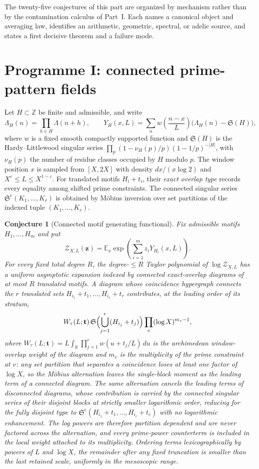 \documentclass[11pt]{article}
\newtheorem{conjecture}{Conjecture}
\theoremstyle{definition}
\newcommand{\SG}{\mathfrak S}
\newcommand{\E}{\mathbb E}
\newcommand{\Z}{\mathbb Z}
\newcommand{\R}{\mathbb R}
\newcommand{\eps}{\varepsilon}
\providecommand{\Z}{\mathbb Z}
\providecommand{\R}{\mathbb R}
\providecommand{\E}{\mathbb E}
\begin{document}
The twenty-five conjectures of this part are organized by mechanism rather
than by the contamination calculus of Part~I.  Each names a canonical
object and averaging law, identifies an arithmetic, geometric, spectral, or
adelic source, and states a first decisive theorem and a failure mode.

\section{Programme I: connected prime-pattern fields}

Let $H\subset\Z$ be finite and admissible, and write
\[
 \Lambda_H(n)=\prod_{h\in H}\Lambda(n+h),\qquad
 Y_H(x,L)=\sum_n w\!\left(\frac{n-x}{L}\right)
 \bigl(\Lambda_H(n)-\SG(H)\bigr),
\]
where $w$ is a fixed smooth compactly supported function and $\SG(H)$ is the
Hardy--Littlewood singular series
$\prod_p(1-\nu_H(p)/p)(1-1/p)^{-|H|}$, with $\nu_H(p)$ the number of residue
classes occupied by $H$ modulo $p$.  The window position $x$ is
sampled from $[X,2X]$ with density $dx/(x\log2)$ and
$X^\eps\le L\le X^{1-\eps}$.  For translated motifs $H_i+t_i$, their \emph{exact
overlap type} records every equality among shifted prime constraints.  The connected
singular series $\SG^{\mathrm c}(K_1,\ldots,K_r)$ is obtained by M\"obius inversion over
set partitions of the indexed tuple $(K_1,\ldots,K_r)$.

\begin{conjecture}[Connected motif generating functional]\label{s1}
Fix admissible motifs $H_1,\ldots,H_m$ and put
\[
 \mathcal Z_{X,L}(\mathbf z)=
 \E_x\exp\!\left(\sum_{i=1}^m z_iY_{H_i}(x,L)\right).
\]
For every fixed total degree $R$, the degree-$\le R$ Taylor polynomial of
$\log\mathcal Z_{X,L}$ has a uniform asymptotic expansion indexed by connected exact-overlap diagrams of at most $R$ translated motifs.  A diagram whose coincidence hypergraph connects the $r$ translated sets
$H_{i_1}+t_1,\ldots,H_{i_r}+t_r$ contributes, at the leading order of its stratum,
\[
 W_\tau(L;\mathbf t)\,
 \SG\Bigl(\bigcup_{j=1}^r(H_{i_j}+t_j)\Bigr)
 \prod_v(\log X)^{m_v-1},
\]
where $W_\tau(L;\mathbf t)=L\int_{\R}\prod_{j=1}^rw(u+t_j/L)\,du$ is the
archimedean window-overlap weight of the diagram and
$m_v$ is the multiplicity of the prime constraint at $v$: any set partition that
separates a coincidence loses at least one factor of $\log X$, so the M\"obius
alternation leaves the single-block moment as the leading term of a connected diagram.
The same alternation cancels the leading terms of disconnected diagrams, whose
contribution is carried by the connected singular series of their disjoint blocks at
strictly smaller logarithmic order, reducing for the fully disjoint type to
$\SG^{\mathrm c}(H_{i_1}+t_1,\ldots,H_{i_r}+t_r)$ with no logarithmic enhancement.
The log powers are therefore partition dependent and are never factored across the
alternation, and every prime-power counterterm is included in the local weight attached
to its multiplicity.  Ordering
terms lexicographically by powers of $L$ and $\log X$, the remainder after any fixed
truncation is smaller than the last retained scale, uniformly in the mesoscopic range.
\end{conjecture}
\end{document}
